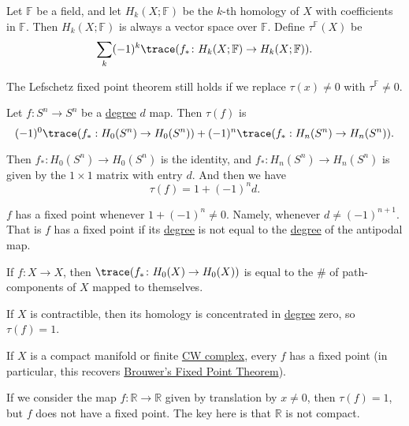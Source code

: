 \begin{definition}\label{def:Lefschetz-number-better}
	Let \(\mathbb{F}\) be a field, and let \(H_k(X; \mathbb{F})\) be the \(k\)-th homology of \(X\) with coefficients in \(\mathbb{F}\).
	Then \(H_k(X; \mathbb{F})\) is always a vector space over \(\mathbb{F}\). Define \(\tau^{\mathbb{F}}(X)\) be
	\[
		\sum_k (-1)^k \trace(f_\ast \colon H_k(X; \mathbb{F}) \to H_k(X; \mathbb{F})).
	\]

	The Lefschetz fixed point theorem still holds if we replace \(\tau(x) \neq 0\) with \(\tau^{\mathbb{F}} \neq 0\).
\end{definition}

\begin{eg}
	Let \(f \colon S^n \to S^n\) be a \hyperref[def:degree]{degree} \(d\) map. Then \(\tau(f)\) is
	\[
		(-1)^0\trace(f_\ast : H_0(S^n) \to H_0(S^n)) + (-1)^n\trace(f_\ast : H_n(S^n) \to H_n(S^n)).
	\]

	Then \(f_\ast \colon H_0(S^n) \to H_0(S^n)\) is the identity, and \(f_\ast \colon H_n(S^n) \to H_n(S^n)\) is given by the
	\(1 \times 1\) matrix with entry \(d\). And then we have
	\[
		\tau(f) = 1 + (-1)^n d.
	\]
\end{eg}

\begin{corollary}
	\(f\) has a fixed point whenever \(1 + (-1)^n \neq 0\). Namely, whenever \(d \neq (-1)^{n + 1}\). That is \(f\) has a fixed point if its
	\hyperref[def:degree]{degree} is not equal to the \hyperref[def:degree]{degree} of the antipodal map.
\end{corollary}

\begin{exercise}
	If \(f \colon X \to X\), then \(\trace(f_\ast \colon H_0(X) \to H_0(X))\) is equal to the \# of path-components of \(X\) mapped to themselves.
\end{exercise}

\begin{exercise}
	If \(X\) is contractible, then its homology is concentrated in \hyperref[def:degree]{degree} zero, so \(\tau(f) = 1\).

	If \(X\) is a compact manifold or finite \hyperref[def:CW-Complex]{CW complex}, every \(f\) has a fixed point (in particular,
	this recovers \hyperref[thm:Brouwer-fixed-point]{Brouwer's Fixed Point Theorem}).
\end{exercise}

\begin{eg}
	If we consider the map \(f \colon \mathbb{R} \to \mathbb{R}\) given by translation by \(x \neq 0\), then \(\tau(f) = 1\), but \(f\) does not have a fixed point.
	The key here is that \(\mathbb{R}\) is not compact.
\end{eg}